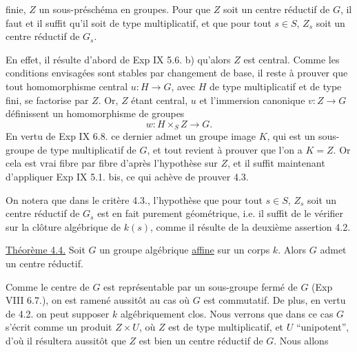 finie,  $Z$ un sous-préschéma en groupes. Pour que $Z$ soit un centre réductif de $G$, il faut et il suffit qu'il soit de type multiplicatif, et que pour tout $s\in S$,  $Z_s$ soit un centre réductif de $G_s$.

En effet, il résulte d'abord de Exp IX 5.6. b) qu'alors $Z$ est central. Comme les conditions envisagées sont stables par changement de base, il reste à prouver que tout homomorphisme central $u:H\longrightarrow G$, avec $H$ de type multiplicatif et de type fini, se factorise par $Z$. Or, $Z$ étant central, $u$ et l'immersion canonique $v:Z\longrightarrow G$ définissent un homomorphisme de groupes
\[
w:H\times_S Z\longrightarrow G.
\]
En vertu de Exp IX 6.8. ce dernier admet un groupe image $K$, qui est un sous-groupe de type multiplicatif de $G$, et tout revient à prouver que l'on a $K=Z$. Or cela est vrai fibre par fibre d'après l'hypothèse sur $Z$, et il suffit maintenant d'appliquer Exp IX 5.1. bis, ce qui achève de prouver 4.3.

On notera que dans le critère 4.3., l'hypothèse que pour tout $s\in S$, $Z_s$ soit un centre réductif de $G_s$ est en fait purement géométrique, i.e. il suffit de le vérifier sur la clôture algébrique de $k(s)$, comme il résulte de la deuxième assertion 4.2.

\uline{Théorème 4.4.} Soit $G$ un groupe algébrique \uline{affine} sur un corps $k$. Alors $G$ admet un centre réductif.

Comme le centre de $G$ est représentable par un sous-groupe fermé de $G$ (Exp VIII 6.7.), on est ramené aussitôt au cas où $G$ est commutatif. De plus, en vertu de 4.2. on peut supposer $k$ algébriquement clos. Nous verrons  que dans ce cas $G$ s'écrit comme un produit  $Z\times U$, où $Z$ est de type multiplicatif, et $U$ ``unipotent'', d'où il résultera aussitôt que $Z$ est bien un centre réductif de $G$. Nous allons
